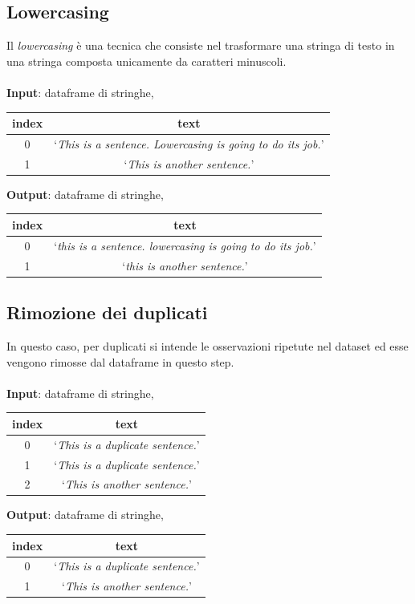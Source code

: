 \documentclass[12pt]{report}
\theoremstyle{definition}
\begin{document}
\subsection{Lowercasing}
Il \textit{lowercasing} è una tecnica che consiste nel trasformare una stringa di testo in una stringa composta unicamente da caratteri minuscoli.
\\
\\
\textbf{Input}: dataframe di stringhe,
\begin{center}
    \begin{tabular}{|c|c|}
    \hline
    \textbf{index} & \textbf{text} \\
    \hline
         0 & `\textit{This is a sentence. Lowercasing is going to do its job.}'\\
         1 & `\textit{This is another sentence.}'\\
    \hline
    \end{tabular}
\end{center}
\textbf{Output}: dataframe di stringhe,
\begin{center}
    \begin{tabular}{|c|c|}
    \hline
    \textbf{index} & \textbf{text} \\
    \hline
         0 & `\textit{this is a sentence. lowercasing is going to do its job.}'\\
         1 & `\textit{this is another sentence.}'\\
    \hline
    \end{tabular}
\end{center}

\subsection{Rimozione dei duplicati}
In questo caso, per duplicati si intende le osservazioni ripetute nel dataset ed esse vengono rimosse dal dataframe in questo step.
\\
\\
\textbf{Input}: dataframe di stringhe,
\begin{center}
    \begin{tabular}{|c|c|}
    \hline
    \textbf{index} & \textbf{text} \\
    \hline
         0 & `\textit{This is a duplicate sentence.}'\\
         1 & `\textit{This is a duplicate sentence.}'\\
         2 & `\textit{This is another sentence.}'\\
    \hline
    \end{tabular}
\end{center}
\textbf{Output}: dataframe di stringhe,
\begin{center}
    \begin{tabular}{|c|c|}
    \hline
    \textbf{index} & \textbf{text} \\
    \hline
         0 & `\textit{This is a duplicate sentence.}'\\
         1 & `\textit{This is another sentence.}'\\
    \hline
    \end{tabular}
\end{center}
\end{document}
